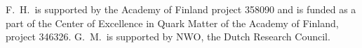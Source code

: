 
F.~H.\ is supported by the Academy of Finland
project 358090 and is funded as a part of the Center
of Excellence in Quark Matter of the Academy of Finland, project 346326.
G.~M.\ is supported by NWO, the Dutch Research Council.
